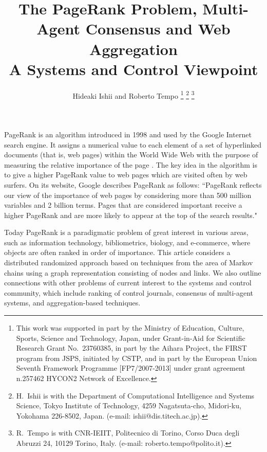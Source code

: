 \documentclass[11pt,draftcls,onecolumn]{IEEEtran}
\begin{document}
\title{%
 The PageRank Problem, Multi-Agent Consensus and Web Aggregation\\
{\Large A Systems and Control Viewpoint}
}

\author{%
Hideaki Ishii
and
Roberto Tempo
\thanks{%
This work was supported in part by the Ministry of Education, Culture, Sports, 
Science and Technology, Japan, under Grant-in-Aid for Scientific Research Grant 
No.~23760385, in part by the Aihara Project, the FIRST program from JSPS, initiated
by CSTP, and in part by the European Union
Seventh Framework Programme [FP7/2007-2013] under grant agreement n.257462 HYCON2 Network
of Excellence.}
\thanks{%
H.~Ishii is with the Department of Computational Intelligence 
and Systems Science, Tokyo Institute of Technology,
4259 Nagatsuta-cho, Midori-ku, Yokohama 226-8502, Japan.
(e-mail: ishii@dis.titech.ac.jp).} 
\thanks{%
R.~Tempo is with CNR-IEIIT, Politecnico di Torino, 
Corso Duca degli Abruzzi 24, 10129 Torino, Italy.
(e-mail: roberto.tempo@polito.it).}}


\maketitle



PageRank is an algorithm introduced in 1998 and used by the Google Internet search engine.
It assigns a numerical value to each element of a set of hyperlinked documents 
(that is, web pages) within the World Wide Web with the purpose of measuring 
the relative importance of the page \cite{google:13}. 
The key idea in the algorithm is to give a higher PageRank value to 
web pages which are visited often by web surfers.
On its website, Google describes PageRank as follows:
``PageRank reflects our view of the importance of web pages by considering 
more than 500 million variables and 2 billion terms. Pages that are considered
important receive a higher PageRank and are more likely to appear at 
the top of the search results."

Today PageRank is a paradigmatic problem 
of great interest in various areas, such as
information technology, bibliometrics, biology, and e-commerce, 
where objects are often ranked in order of importance. 
This article considers a distributed randomized approach based on 
techniques from the area of Markov chains 
using a graph representation consisting of nodes and links.
We also outline connections with other 
problems of current interest to the systems and control community, 
which include ranking of control journals, consensus of multi-agent 
systems, and aggregation-based techniques.
\end{document}
